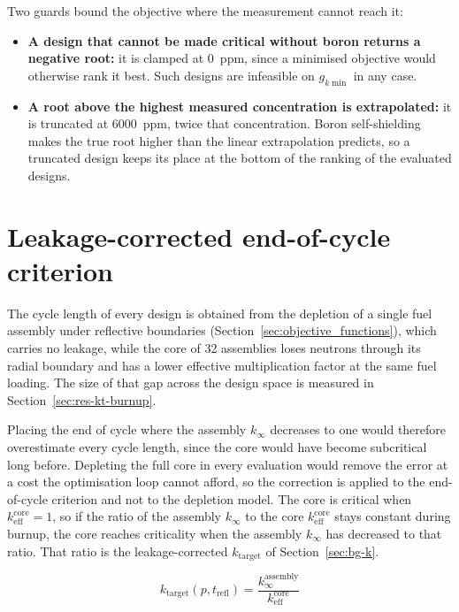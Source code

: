 Two guards bound the objective where the measurement cannot reach it:

\begin{itemize}
  \item \textbf{A design that cannot be made critical without boron
        returns a negative root:} it is clamped at \SI{0}{ppm}, since a
        minimised objective would otherwise rank it best. Such designs
        are infeasible on $g_{k\min}$ in any case.

  \item \textbf{A root above the highest measured concentration is
        extrapolated:} it is truncated at \SI{6000}{ppm}, twice that
        concentration. Boron self-shielding makes the true root higher
        than the linear extrapolation predicts, so a truncated design
        keeps its place at the bottom of the ranking of the evaluated designs.
\end{itemize}

\section{Leakage-corrected end-of-cycle criterion}
\label{sec:meth-ktarget}

The cycle length of every design is obtained from the depletion of a
single fuel assembly under reflective boundaries
(Section~\ref{sec:objective_functions}), which carries no leakage,
while the core of 32 assemblies loses neutrons through its radial
boundary and has a lower effective multiplication factor at the same fuel loading. The
size of that gap across the design space is measured in
Section~\ref{sec:res-kt-burnup}.

Placing the end of cycle where the assembly $k_\infty$ decreases to one
would therefore overestimate every cycle length, since the core would
have become subcritical long before. Depleting the full core in every
evaluation would remove the error at a cost the optimisation loop
cannot afford, so the correction is applied to the end-of-cycle
criterion and not to the depletion model. The core is critical when
$k_\mathrm{eff}^\mathrm{core} = 1$, so if the ratio of the assembly $k_\infty$ to the core $k_\mathrm{eff}^\mathrm{core}$ stays constant during burnup, the core reaches
criticality when the assembly $k_\infty$ has decreased to that ratio. That
ratio is the leakage-corrected $k_\mathrm{target}$ of Section~\ref{sec:bg-k}.

\begin{equation}
k_\mathrm{target}(p, t_\mathrm{refl})
= \frac{k_\infty^\mathrm{assembly}}{k_\mathrm{eff}^\mathrm{core}}
\label{eq:ktarget}
\end{equation}

